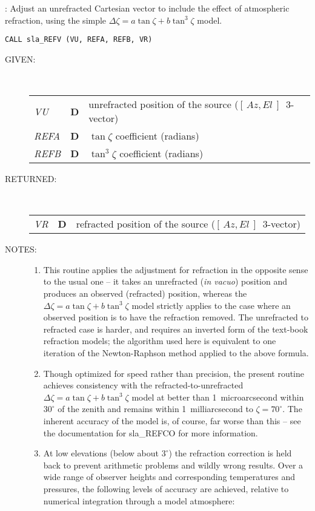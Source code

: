 \documentclass[11pt,twoside]{article}
\newcommand{\azel}      {$[\,Az,El~]$}
\newcommand{\action}[1]
{\item[ACTION]: #1}
\newcommand{\action}[1]
   {\item[ACTION:] #1}
\newcommand{\call}[1]
{\item[CALL]: \hspace{0.4em}{\tt #1}}
\newlength{\oldspacing}
\renewcommand{\call}[1]
   {
    \item[CALL:] {\tt #1}
   }
\newcommand{\args}[2]
{
  \goodbreak
  \setlength{\oldspacing}{\topsep}
  \setlength{\topsep}{0.3ex}
  \begin{description}
  \item[#1]:\\[1.5ex]
    \begin{tabular}{p{7em}p{6em}p{22em}}
      #2
    \end{tabular}
  \end{description}
  \setlength{\topsep}{\oldspacing}
}
\renewcommand{\args}[2]
   {
     \begin{description}
        \item[#1:]\\
        \begin{tabular}{p{7em}p{6em}l}
           #2
        \end{tabular}
     \end{description}
   }
\newcommand{\spec}[3]
{
  {\em {#1}} & {\bf \mbox{#2}} & {#3}
}
\newcommand{\notes}[1]
{
  \goodbreak
  \setlength{\oldspacing}{\topsep}
  \setlength{\topsep}{0.3ex}
  \begin{description}
    \item[NOTES]:
        #1
  \end{description}
  \setlength{\topsep}{\oldspacing}
}
\renewcommand{\notes}[1]
   {
      \begin{description}
         \item[NOTES:]
            #1
      \end{description}
   }
\begin{document}
{
 \action{Adjust an unrefracted Cartesian vector to include the effect of
         atmospheric refraction, using the simple
         $\Delta \zeta = a \tan \zeta + b \tan^{3} \zeta$ model.}
 \call{CALL sla\_REFV (VU, REFA, REFB, VR)}
}
\args{GIVEN}
{
 \spec{VU}{D}{unrefracted position of the source (\azel\ 3-vector)} \\
 \spec{REFA}{D}{$\tan \zeta$ coefficient (radians)} \\
 \spec{REFB}{D}{$\tan^{3} \zeta$ coefficient (radians)}
}
\args{RETURNED}
{
 \spec{VR}{D}{refracted position of the source (\azel\ 3-vector)}
}
\notes
{
 \begin{enumerate}
  \item This routine applies the adjustment for refraction in the
        opposite sense to the usual one -- it takes an unrefracted
        ({\it in vacuo}\/) position and produces an observed (refracted)
        position, whereas the
        $\Delta \zeta = a \tan \zeta + b \tan^{3} \zeta$
        model strictly
        applies to the case where an observed position is to have the
        refraction removed.  The unrefracted to refracted case is
        harder, and requires an inverted form of the text-book
        refraction models;  the algorithm used here is equivalent to
        one iteration of the Newton-Raphson method applied to the
        above formula.
  \item Though optimized for speed rather than precision, the present
        routine achieves consistency with the refracted-to-unrefracted
        $\Delta \zeta = a \tan \zeta + b \tan^{3} \zeta$
        model at better than 1~microarcsecond within
        $30^\circ$ of the zenith and remains within 1~milliarcsecond to
        $\zeta=70^\circ$.  The inherent accuracy of the model is, of
        course, far worse than this -- see the documentation for sla\_REFCO
        for more information.
  \item At low elevations (below about $3^\circ$) the refraction
        correction is held back to prevent arithmetic problems and
        wildly wrong results.  Over a wide range of observer heights
        and corresponding temperatures and pressures, the following
        levels of accuracy are achieved, relative to numerical
        integration through a model atmosphere:


\end{enumerate}}
\end{document}
